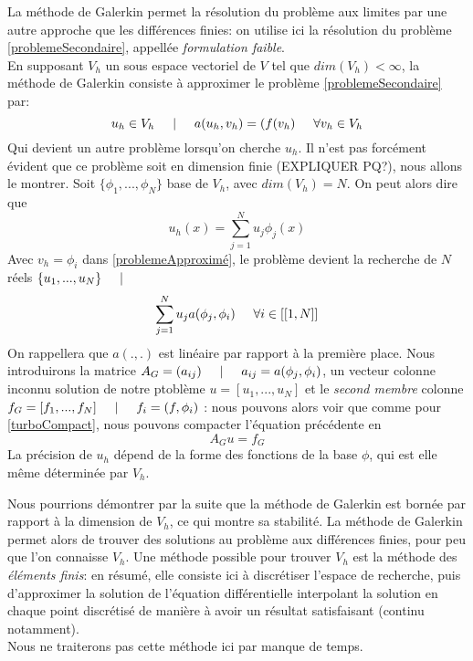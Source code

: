 \documentclass[12pt]{article}
\newcommand{\espace}{\hspace{5mm}}
\begin{document}
La méthode de Galerkin permet la résolution du problème aux limites par une autre approche que les différences finies: on utilise ici la résolution du problème \eqref{problemeSecondaire}, appellée \emph{formulation faible}.\\
En supposant $V_h$ un sous espace vectoriel de $V$ tel que $dim(V_h) < \infty$, la méthode de Galerkin consiste à approximer le problème \eqref{problemeSecondaire} par:
\begin{equation} \label{problemeApproximé}
u_h \in V_h \espace | \espace a(u_h, v_h) = (f(v_h) \espace \forall v_h \in V_h
\end{equation}
Qui devient un autre problème lorsqu'on cherche $u_h$.
Il n'est pas forcément évident que ce problème soit en dimension finie (EXPLIQUER PQ?), nous allons le montrer. Soit $\{\phi_1, ..., \phi_N\}$ base de $V_h$, avec $dim(V_h) = N$. On peut alors dire que 
\begin{equation}
u_h(x) = \sum_{j = 1}^{N} u_j \phi_j(x)
\end{equation}
Avec $v_h = \phi_i$ dans \eqref{problemeApproximé}, le problème devient la recherche de $N$ réels $\{u_1, ..., u_N\} \espace |$
\begin{equation}
\sum_{j=1}^N u_j a(\phi_j, \phi_i) \espace \forall i \in [[1,N]]
\end{equation}
On rappellera que $a(.,.)$ est linéaire par rapport à la première place.
Nous introduirons la matrice $A_G = (a_{ij}) \espace | \espace a_{ij} = a(\phi_j, \phi_i)$, un vecteur colonne inconnu solution de notre ptoblème $u = [u_1, ..., u_N]$ et le \emph{second membre} colonne $f_G = [f_1, ..., f_N] \espace | \espace f_i = (f, \phi_i)$ : nous pouvons alors voir que comme pour \eqref{turboCompact}, nous pouvons compacter l'équation précédente en 
\begin{equation}
A_G u = f_G
\end{equation}
La précision de $u_h$ dépend de la forme des fonctions de la base $\phi$, qui est elle même déterminée par $V_h$.

Nous pourrions démontrer par la suite que la méthode de Galerkin est bornée par rapport à la dimension de $V_h$,  ce qui montre sa stabilité.
La méthode de Galerkin permet alors de trouver des solutions au problème aux différences finies, pour peu que l'on connaisse $V_h$. Une méthode possible pour trouver $V_h$ est la méthode des \emph{éléments finis}: en résumé, elle consiste ici à discrétiser l'espace de recherche, puis d'approximer la solution de l'équation différentielle interpolant la solution en chaque point discrétisé de manière à avoir un résultat satisfaisant (continu notamment).\\
Nous ne traiterons pas cette méthode ici par manque de temps.
\end{document}
